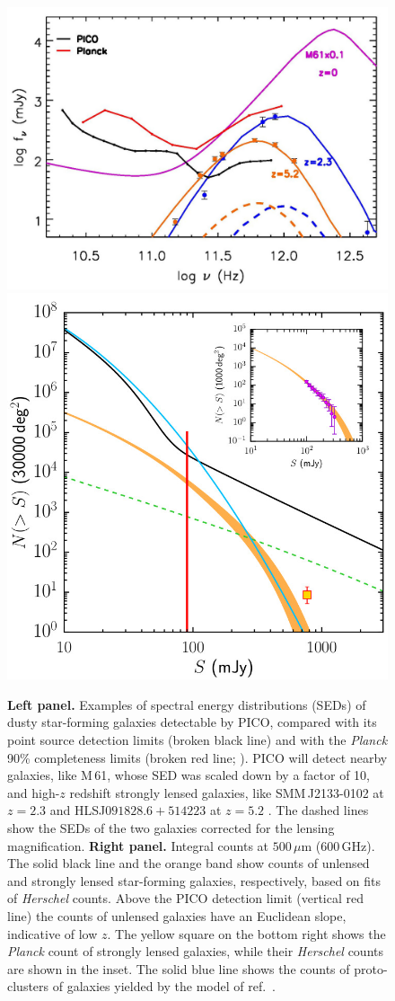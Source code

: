 \documentclass[11pt,a4paper]{article}
\begin{document}






\begin{figure}
\begin{center}
\includegraphics[width=0.43\columnwidth, trim={0 0 0 0cm}, clip]{fig_SED_PICO.jpg}
\includegraphics[width=0.50\columnwidth, height=5.5truecm, trim={0 0 0 0cm}, clip]{NgtF_pico_new.jpg}
\vskip-0.3cm
\caption{\textbf{Left panel.} Examples of spectral energy distributions (SEDs) of dusty star-forming galaxies detectable by PICO, compared with its point source detection limits (broken black line) and with the \textit{Planck} 90\% completeness limits (broken red line; \cite{PCCS2}). PICO will detect nearby galaxies, like M\,61, whose SED was scaled down by a factor of 10, and high-$z$ redshift strongly lensed galaxies, like SMM\,J2133-0102  at $z=2.3$ \cite{Swinbank2010} and HLSJ$091828.6+514223$ at $z=5.2$ \cite{Combes2012}. The dashed  lines show the SEDs of the two galaxies corrected for the lensing magnification.  \textbf{Right panel.} Integral counts at $500\,\mu$m (600\,GHz). The solid black line and the orange band show counts of unlensed and strongly lensed star-forming galaxies, respectively, based on fits of \textit{Herschel} counts. Above the PICO detection limit (vertical red line) the counts of unlensed galaxies have an Euclidean slope, indicative of low $z$. The yellow square on the bottom right shows the \textit{Planck} count of strongly lensed galaxies, while their \textit{Herschel} counts \cite{Negrello2017lensed} are shown in the inset. The solid blue line shows the counts of proto-clusters of galaxies yielded by the model of ref.~\cite{Negrello2017protocl}.}
\label{fig:SED3}
\end{center}
\end{figure}
\end{document}

